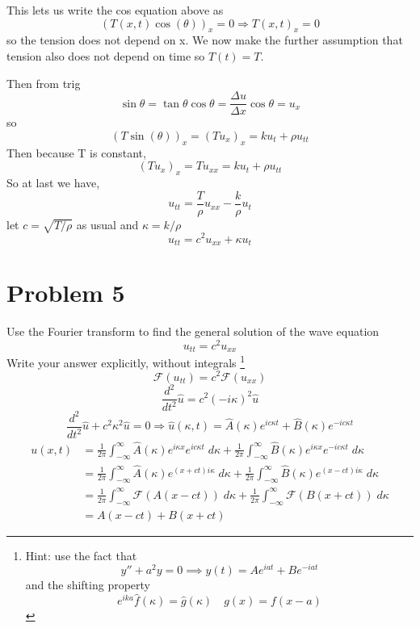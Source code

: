 \documentclass[12pt]{article}
\renewcommand{\hat}[1]{\widehat{#1}}
\newcommand{\F}[1]{\mathcal{F}(#1)}
\begin{document}
This lets us write the cos equation above as 
\[(T(x, t)\cos(\theta))_x = 0 \Longrightarrow T(x, t)_x = 0\]
so the tension does not depend on x. We now make the further assumption that tension also does not depend on time so $T(t) = T$. 

Then from trig 
\[\sin \theta = \tan \theta \cos \theta = \frac{\Delta u}{\Delta x} \cos \theta = u_x\]
so 
\[(T\sin(\theta))_x = (Tu_x)_x = ku_t + \rho u_{tt}\]
Then because T is constant,
\[(Tu_x)_x = Tu_{xx} = ku_t + \rho u_{tt}\]
So at last we have, 
\[u_{tt} = \frac{T}{\rho}u_{xx} - \frac{k}{\rho}u_t\]
let $c = \sqrt{T/\rho}$ as usual and $\kappa = k / \rho$ 
\[\boxed{u_{tt} = c^2 u_{xx} + \kappa u_t}\]

\color{black}
\pagebreak
\section*{Problem 5}
Use the Fourier transform to find the general
solution of the wave equation
\[u_{tt} = c^2 u_{xx}\]
Write your answer explicitly, without integrals \footnote{Hint: use the fact that 
\[y'' + a^2y = 0 \implies y(t) = Ae^{iat} + Be^{-iat}\] 
and the shifting property 
\[e^{ika} \hat{f}(\kappa) = \hat{g}(\kappa) \quad g(x) = f(x - a)\]}
\color{blue}
\[\F{u_{tt}} = c^2\F{u_{xx}}\]
\[\frac{d^2}{dt^2}\hat{u} = c^2 (-i\kappa)^2 \hat{u}\]
\[\frac{d^2}{dt^2}\hat{u} + c^2\kappa^2 \hat{u} = 0 \Longrightarrow  \hat{u}(\kappa, t) = \hat{A}(\kappa)e^{ic\kappa t} + \hat{B}(\kappa)e^{-ic\kappa t}\]
\begin{align*}
    u(x, t) &= \frac{1}{2\pi} \int_{-\infty}^\infty \hat{A}(\kappa) e^{i\kappa x}e^{ic\kappa t}\; d\kappa + \frac{1}{2\pi} \int_{-\infty}^\infty \hat{B}(\kappa) e^{i\kappa x}e^{-ic\kappa t}\; d\kappa\\
    &= \frac{1}{2\pi} \int_{-\infty}^\infty \hat{A}(\kappa) e^{(x + ct)i\kappa}\; d\kappa + \frac{1}{2\pi} \int_{-\infty}^\infty \hat{B}(\kappa) e^{(x- ct)i\kappa}\; d\kappa\\
    &= \frac{1}{2\pi} \int_{-\infty}^\infty \F{A(x - ct)} \; d\kappa + \frac{1}{2\pi} \int_{-\infty}^\infty \F{B(x + ct)} \; d\kappa\\
    &=\boxed{A(x-ct) + B(x + ct)}
\end{align*}
\end{document}
